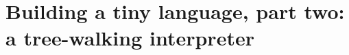 \chapter{Building a tiny language, part two: a tree-walking interpreter}
\label{ch:building-a-tiny-language-part-two-a}

